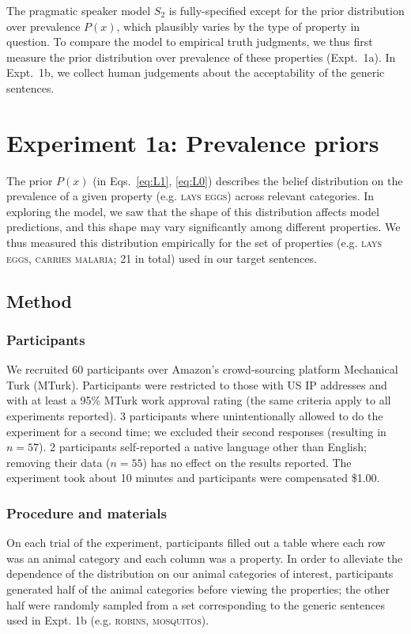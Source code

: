 \documentclass[12pt,letterpaper]{article}
\begin{document}
The pragmatic speaker model $S_2$ is fully-specified except for the prior distribution over prevalence $P(x)$, which plausibly varies by the type of property in question.
To compare the model to empirical truth judgments, we thus first measure the prior distribution over prevalence of these properties (Expt.~1a).
In Expt.~1b, we collect human judgements about the acceptability of the generic sentences. 

\section*{Experiment 1a: Prevalence priors}

The prior $P(x)$ (in Eqs.~\ref{eq:L1}, \ref{eq:L0}) describes the belief distribution on the prevalence of a given property (e.g. \textsc{lays eggs}) across relevant categories. 
In exploring the model, we saw that the shape of this distribution affects model predictions, and this shape may vary significantly among different properties.
We thus measured this distribution empirically for the set of properties (e.g. \textsc{lays eggs, carries malaria}; 21 in total) used in our target sentences. 
 
\subsection*{Method}

\subsubsection*{Participants}
We recruited 60 participants over Amazon's crowd-sourcing platform Mechanical Turk (MTurk).  
Participants were restricted to those with US IP addresses and with at least a 95\% MTurk work approval rating (the same criteria apply to all experiments reported). 
3 participants where unintentionally allowed to do the experiment for a second time; we excluded their second responses (resulting in $n=57$).
2 participants self-reported a native language other than English; removing their data ($n=55$) has no effect on the results reported. 
The experiment took about 10 minutes and participants were compensated \$1.00.

\subsubsection*{Procedure and materials}
On each trial of the experiment, participants filled out a table where each row was an animal category and each column was a property. 
In order to alleviate the dependence of the distribution on our animal categories of interest, participants generated half of the animal categories before viewing the properties; the other half were randomly sampled from a set corresponding to the generic sentences used in Expt. 1b (e.g. \textsc{robins, mosquitos}).
\end{document}
